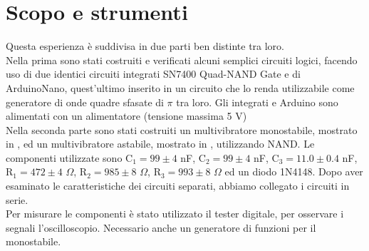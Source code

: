 \section{Scopo e strumenti}
Questa esperienza è suddivisa in due parti ben distinte tra loro.\\
Nella prima sono stati costruiti e verificati alcuni semplici circuiti logici, facendo uso di due identici circuiti integrati SN7400 Quad-NAND 
Gate e di ArduinoNano, quest'ultimo inserito in un circuito che lo renda utilizzabile come generatore di onde quadre sfasate di $\pi$ tra loro. Gli integrati e Arduino sono alimentati con un alimentatore (tensione massima 5 V)\\
Nella seconda parte sono stati costruiti un multivibratore monostabile, mostrato in , ed un multivibratore astabile, mostrato in , utilizzando NAND. Le componenti utilizzate sono C$_1 = 99 \pm 4$ nF, C$_2 = 99 \pm 4$ nF, C$_3 = 11.0 \pm 0.4 $ nF, R$_1 = 472 \pm 4$ $\Omega$, R$_2 = 985 \pm 8$ $\Omega$, R$_3 = 993 \pm 8$ $\Omega$ ed un diodo 1N4148. Dopo aver esaminato le caratteristiche dei circuiti separati, abbiamo collegato i circuiti in serie.\\ 
Per misurare le componenti è stato utilizzato il tester digitale, per osservare i segnali l'oscilloscopio. Necessario anche un generatore di funzioni per il monostabile.

